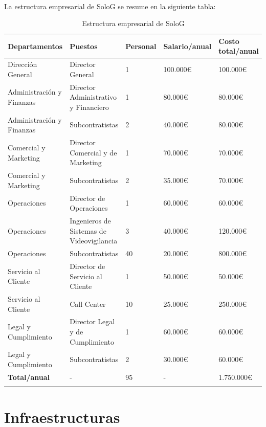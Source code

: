 \documentclass{report}
\begin{document}
            \paragraph{}
            {
              La estructura empresarial de SoloG se resume en la siguiente tabla:
            }
            \begin{longtable}{|p{3cm}|p{3cm}|p{3cm}|p{3cm}|p{3cm}|}
              \hline
              \textbf{Departamentos} & \textbf{Puestos} & \textbf{Personal} & \textbf{Salario/anual} & \textbf{Costo total/anual}\\
              \hline
              \hline
              Dirección General & Director General & 1 & 100.000€ & 100.000€\\
              \hline
              Administración y Finanzas & Director Administrativo y Financiero & 1 & 80.000€ & 80.000€\\
              \hline
              Administración y Finanzas & Subcontratistas & 2 & 40.000€ & 80.000€\\
              \hline
              Comercial y Marketing & Director Comercial y de Marketing & 1 & 70.000€ & 70.000€\\
              \hline
              Comercial y Marketing & Subcontratistas & 2 & 35.000€ & 70.000€\\
              \hline
              Operaciones & Director de Operaciones & 1 & 60.000€ & 60.000€\\
              \hline
              Operaciones & Ingenieros de Sistemas de Videovigilancia & 3 & 40.000€ & 120.000€\\
              \hline
              Operaciones & Subcontratistas & 40 & 20.000€ & 800.000€\\
              \hline
              Servicio al Cliente & Director de Servicio al Cliente & 1 & 50.000€ & 50.000€\\
              \hline
              Servicio al Cliente & Call Center & 10 & 25.000€ & 250.000€\\
              \hline
              Legal y Cumplimiento & Director Legal y de Cumplimiento & 1 & 60.000€ & 60.000€\\
              \hline
              Legal y Cumplimiento & Subcontratistas & 2 & 30.000€ & 60.000€\\
              \hline
              \textbf{Total/anual}& - & 95 & - & 1.750.000€\\
              \hline
              \caption{Estructura empresarial de SoloG}
            \end{longtable}
        \clearpage\section{Infraestructuras}
\end{document}
